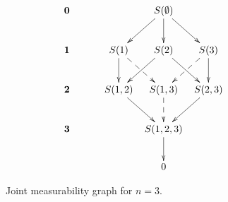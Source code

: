 \begin{figure}[h]
$$
\xymatrix@C=2mm{
\mathbf{0}&&&&S(\emptyset) \ar[dl]\ar[dr]\ar[d]&&&\\
\mathbf{1}&&&S(1)\ar@{-->}[dr]\ar[d]&S(2)\ar[dl]\ar[dr]&S(3)\ar[d]\ar@{-->}[dl]&&\\
\mathbf{2}&&&S(1,2)\ar[dr]&S(1,3)\ar@{-->}[d]&S(2,3)\ar[dl]&&\\
\mathbf{3}&&&&S(1,2,3)\ar[d]&&&\\
&&&&0&&&\\
}
$$
\caption{Joint measurability graph for $n=3$.}
\label{fig:graph_n_3}
\end{figure}